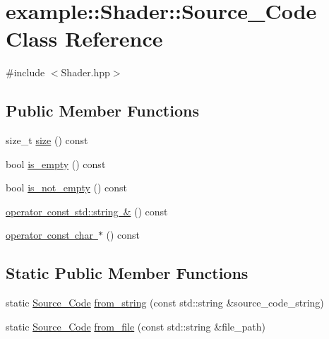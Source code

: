 \hypertarget{classexample_1_1_shader_1_1_source___code}{}\section{example\+:\+:Shader\+:\+:Source\+\_\+\+Code Class Reference}
\label{classexample_1_1_shader_1_1_source___code}


{\ttfamily \#include $<$Shader.\+hpp$>$}

\subsection*{Public Member Functions}
\begin{DoxyCompactItemize}
\item 
size\+\_\+t \mbox{\hyperlink{classexample_1_1_shader_1_1_source___code_a292ec182f1e3e7440bbda037c25df24c}{size}} () const
\item 
bool \mbox{\hyperlink{classexample_1_1_shader_1_1_source___code_ab3ffac64d2530fbd4fe51b9c7835afda}{is\+\_\+empty}} () const
\item 
bool \mbox{\hyperlink{classexample_1_1_shader_1_1_source___code_a316341560e88e77b03b1a7e0cdcaff57}{is\+\_\+not\+\_\+empty}} () const
\item 
\mbox{\hyperlink{classexample_1_1_shader_1_1_source___code_a61fcc5c271673f67740263735e40759d}{operator const std\+::string \&}} () const
\item 
\mbox{\hyperlink{classexample_1_1_shader_1_1_source___code_ae9f1b732bad5360c81abdf0912cb0f9e}{operator const char $\ast$}} () const
\end{DoxyCompactItemize}
\subsection*{Static Public Member Functions}
\begin{DoxyCompactItemize}
\item 
static \mbox{\hyperlink{classexample_1_1_shader_1_1_source___code}{Source\+\_\+\+Code}} \mbox{\hyperlink{classexample_1_1_shader_1_1_source___code_a3f8055dfc7cd546d51927c5a1b1795cc}{from\+\_\+string}} (const std\+::string \&source\+\_\+code\+\_\+string)
\item 
static \mbox{\hyperlink{classexample_1_1_shader_1_1_source___code}{Source\+\_\+\+Code}} \mbox{\hyperlink{classexample_1_1_shader_1_1_source___code_ab242ffd8eddb3b50e5e31ab8d06bf09d}{from\+\_\+file}} (const std\+::string \&file\+\_\+path)
\end{DoxyCompactItemize}


